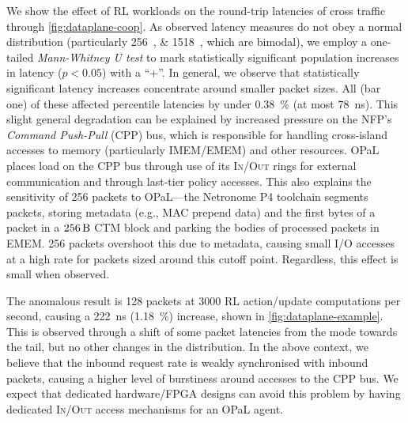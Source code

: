 \documentclass[sigconf,natbib=false]{acmart}
\newcommand{\approachshort}{OPaL}
\newcommand{\inring}{\textsc{In}}
\newcommand{\outring}{\textsc{Out}}
\begin{document}
We show the effect of RL workloads on the round-trip latencies of cross traffic through \cref{fig:dataplane-coop}.
As observed latency measures do not obey a normal distribution (particularly \SIlist{256;1518}{\byte}, which are bimodal), we employ a one-tailed \emph{Mann-Whitney U test} to mark statistically significant population increases in latency ($p < 0.05$) with a ``+''.
In general, we observe that statistically significant latency increases concentrate around smaller packet sizes.
All (bar one) of these affected  percentile latencies by under \SI{0.38}{\percent} (at most \SI{78}{\nano\second}).
This slight general degradation can be explained by increased pressure on the NFP's \emph{Command Push-Pull} (CPP) bus, which is responsible for handling cross-island accesses to memory (particularly IMEM/EMEM) and other resources.
\approachshort{} places load on the CPP bus through use of its \inring{}/\outring{} rings for external communication and through last-tier policy accesses.
This also explains the sensitivity of \SI{256}{\byte} packets to \approachshort{}---the Netronome P4 toolchain segments packets, storing metadata (e.g., MAC prepend data) and the first bytes of a packet in a $\SI{256}{\byte}$ CTM block and parking the bodies of processed packets in EMEM.
\SI{256}{\byte} packets overshoot this due to metadata, causing small I/O accesses at a high rate for packets sized around this cutoff point.
Regardless, this effect is small when observed.

The anomalous result is \SI{128}{\byte} packets at \num{3000} RL action/update computations per second, causing a \SI{222}{\nano\second} (\SI{1.18}{\percent}) increase, shown in \cref{fig:dataplane-example}.
This is observed through a shift of some packet latencies from the mode towards the tail, but no other changes in the distribution.
In the above context, we believe that the inbound request rate is weakly synchronised with inbound packets, causing a higher level of burstiness around accesses to the CPP bus.
We expect that dedicated hardware/FPGA designs can avoid this problem by having dedicated \inring{}/\outring{} access mechanisms for an \approachshort{} agent.
\end{document}
